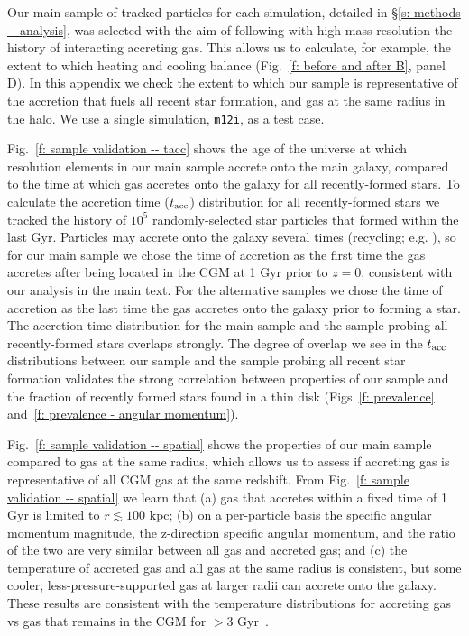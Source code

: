 \documentclass[fleqn,usenatbib]{mnras}
\newcommand{\tacc}{t_{\rm acc}}
\begin{document}
Our main sample of tracked particles for each simulation, detailed in \S\ref{s: methods -- analysis}, was selected with the aim of following with high mass resolution the history of interacting accreting gas.
This allows us to calculate, for example, the extent to which heating and cooling balance (Fig.~\ref{f: before and after B}, panel D).
In this appendix we check the extent to which our sample is representative of the accretion that fuels all recent star formation, and gas at the same radius in the halo.
We use a single simulation, \texttt{m12i}, as a test case.

Fig.~\ref{f: sample validation -- tacc} shows the age of the universe at which resolution elements in our main sample accrete onto the main galaxy, compared to the time at which gas accretes onto the galaxy for all recently-formed stars.
To calculate the accretion time ($\tacc$) distribution for all recently-formed stars we tracked the history of $10^5$ randomly-selected star particles that formed within the last Gyr.
Particles may accrete onto the galaxy several times (recycling; e.g. \citealt{Angles-Alcazar2017}), so for our main sample we chose the time of accretion as the first time the gas accretes after being located in the CGM at 1 Gyr prior to $z=0$, consistent with our analysis in the main text.
For the alternative samples we chose the time of accretion as the last time the gas accretes onto the galaxy prior to forming a star.
The accretion time distribution for the main sample and the sample probing all recently-formed stars overlaps strongly.
The degree of overlap we see in the $\tacc$ distributions between our sample and the sample probing all recent star formation validates the strong correlation between properties of our sample and the fraction of recently formed stars found in a thin disk (Figs~\ref{f: prevalence} and~\ref{f: prevalence - angular momentum}).

Fig.~\ref{f: sample validation -- spatial} shows the properties of our main sample compared to gas at the same radius, which allows us to assess if accreting gas is representative of all CGM gas at the same redshift.
From Fig.~\ref{f: sample validation -- spatial} we learn that (a) gas that accretes within a fixed time of 1 Gyr is limited to $r \lesssim 100$ kpc;
(b) on a per-particle basis the specific angular momentum magnitude, the z-direction specific angular momentum, and the ratio of the two are very similar between all gas and accreted gas;
and (c) the temperature of accreted gas and all gas at the same radius is consistent, but some cooler, less-pressure-supported gas at larger radii can accrete onto the galaxy.
These results are consistent with the temperature distributions for accreting gas vs gas that remains in the CGM for $>3$ Gyr~\citep{Hafen2020}.
\end{document}
